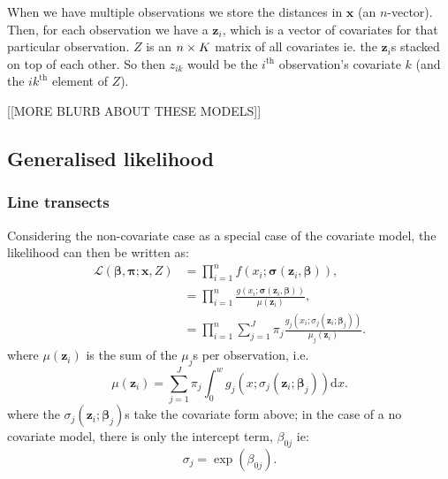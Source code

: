 When we have multiple observations we store the distances in $\bm{x}$ (an $n$-vector). Then, for each observation we have a $\bm{z}_i$, which is a vector of covariates for that particular observation. $Z$ is an $n \times K$ matrix of all covariates ie. the $\bm{z}_i$s stacked on top of each other. So then $z_{ik}$ would be the $i^\text{th}$ observation's covariate $k$ (and the $ik^\text{th}$ element of $Z$).

[[MORE BLURB ABOUT THESE MODELS]]

%
%

\subsection{Generalised likelihood}
\label{ds-genlik}

\subsubsection{Line transects}
Considering the non-covariate case as a special case of the covariate model, the likelihood can then be written as:
\begin{align}
\mathcal{L}(\bm{\beta}, \bm{\pi} ; \bm{x}, Z) &= \prod_{i=1}^n f(x_i;\bm{\sigma}(\bm{z}_i, \bm{\beta})),\\
&= \prod_{i=1}^n \frac{g(x_i;\bm{\sigma}(\bm{z}_i, \bm{\beta}))}{\mu(\bm{z}_i)},\\
&= \prod_{i=1}^n \sum_{j=1}^J \pi_j \frac{g_j(x_i; \sigma_j(\bm{z}_i;\bm{\beta}_j))}{ \mu_j(\bm{z}_i)}.
\label{mmds-lt-glikelihood}
\end{align}
where $\mu(\bm{z}_i)$ is the sum of the $\mu_j$s per observation, i.e.
\begin{equation}
\mu(\bm{z}_i) = \sum_{j=1}^J \pi_j \int_0^w g_j(x; \sigma_j(\bm{z}_i;\bm{\beta}_j)) \text{d}x.
\end{equation}
where the $\sigma_j(\bm{z}_i;\bm{\beta}_j)$s take the covariate form above; in the case of a no covariate model, there is only the intercept term, $\beta_{0j}$ ie:
\begin{equation}
\sigma_j = \exp ( \beta_{0j} ).
\end{equation}

